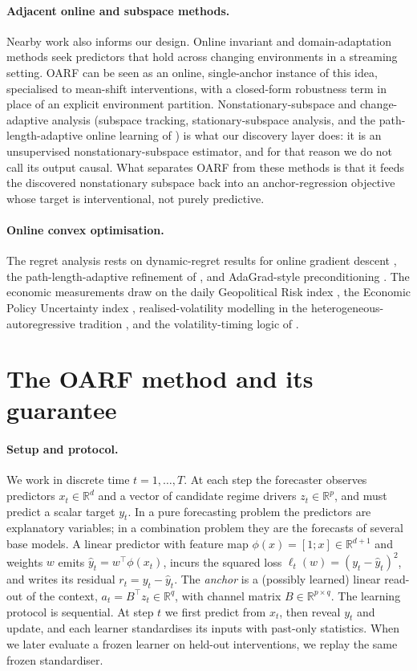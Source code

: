 \documentclass[12pt]{article}
\theoremstyle{plain}
\theoremstyle{remark}
\newcommand{\R}{\mathbb{R}}
\newcommand{\OARF}{\textsc{OARF}}
\begin{document}
\paragraph{Adjacent online and subspace methods.} Nearby work also informs our
design. Online invariant and domain-adaptation methods seek predictors that hold
across changing environments in a streaming setting. \OARF{} can be seen as an
online, single-anchor instance of this idea, specialised to mean-shift
interventions, with a closed-form robustness term in place of an explicit
environment partition. Nonstationary-subspace and change-adaptive analysis
(subspace tracking, stationary-subspace analysis, and the path-length-adaptive
online learning of \citealp{zhang2018adaptive}) is what our discovery layer does:
it is an unsupervised nonstationary-subspace estimator, and for that reason we do
not call its output causal. What separates \OARF{} from these methods is that it
feeds the discovered nonstationary subspace back into an anchor-regression
objective whose target is interventional, not purely predictive.

\paragraph{Online convex optimisation.} The regret analysis rests on dynamic-regret
results for online gradient descent \citep{zinkevich2003ogd,hazan2016oco}, the
path-length-adaptive refinement of \citet{zhang2018adaptive}, and AdaGrad-style
preconditioning \citep{duchi2011adagrad}. The economic measurements draw on the
daily Geopolitical Risk index \citep{caldara2022gpr}, the Economic Policy
Uncertainty index \citep{baker2016epu}, realised-volatility modelling in the
heterogeneous-autoregressive tradition \citep{corsi2009har}, and the
volatility-timing logic of \citet{fleming2001voltiming}.

\section{The OARF method and its guarantee}\label{sec:method}

\paragraph{Setup and protocol.}
We work in discrete time $t=1,\dots,T$. At each step the forecaster observes
predictors $x_t\in\R^d$ and a vector of candidate regime drivers $z_t\in\R^p$, and
must predict a scalar target $y_t$. In a pure forecasting problem the predictors are
explanatory variables; in a combination problem they are the forecasts of several
base models. A linear predictor with feature map
$\phi(x)=[1;x]\in\R^{d+1}$ and weights $w$ emits $\hat y_t=w^\top\phi(x_t)$, incurs
the squared loss $\ell_t(w)=(y_t-\hat y_t)^2$, and writes its residual
$r_t=y_t-\hat y_t$. The \emph{anchor} is a (possibly learned) linear read-out of the
context, $a_t=B^\top z_t\in\R^q$, with channel matrix $B\in\R^{p\times q}$. The learning protocol is sequential. At step $t$ we first predict from $x_t$, then reveal $y_t$ and update, and each learner standardises its inputs with past-only statistics. When we later evaluate a frozen learner on held-out interventions, we replay the same frozen standardiser.
\end{document}
